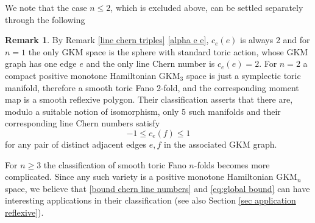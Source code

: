 \documentclass[12pt,a4paper]{amsart}
\theoremstyle{plain}
\theoremstyle{definition}
\newtheorem{rem}[thm]{Remark}
\begin{document}
We note that the case $n\leq 2$, which is excluded above, can be settled separately through the following

\begin{rem}\label{rem open close toric}
By Remark 
\ref{line chern triples} \eqref{alpha e e}, $c_e(e)$ is always 2 and for $n=1$ the only 
GKM space is the sphere with standard toric action, whose GKM graph has one edge $e$ and the only line Chern number is $c_e(e)=2$.
For $n=2$ a compact positive monotone Hamiltonian GKM$_3$ space is just a symplectic toric manifold, therefore 
a smooth toric Fano 2-fold, and the corresponding moment map is a smooth reflexive polygon. Their classification \cite{Ewald1988} asserts that there are, modulo a suitable notion of isomorphism, only 5 such manifolds and their corresponding line Chern numbers satisfy  
$$
-1\leq c_e(f)\leq 1
$$ 
for any pair of distinct adjacent edges $e,f$ in the associated GKM graph. 

For $n\geq 3$ the classification of smooth toric Fano $n$-folds becomes more complicated. Since any such variety
is a positive monotone Hamiltonian GKM$_n$ space, we believe that \eqref{bound chern line numbers} and \eqref{eq:global bound} can have interesting applications in their classification (see also Section \ref{sec application reflexive}).
\end{rem}
\end{document}
